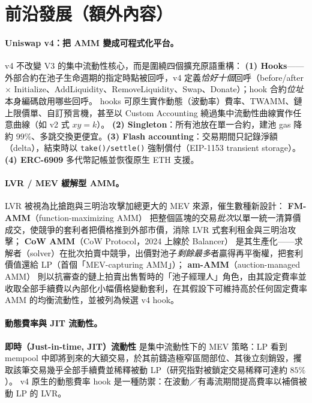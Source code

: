 \documentclass[11pt,a4paper]{article}
\begin{document}
\section{前沿發展（額外內容）}\label{sec:frontier}
\paragraph{Uniswap v4：把 AMM 變成可程式化平台。}
v4 \citep{uniswapv4wp,uniswapv4vision,uniswapv4hooks} 不改變 V3 的集中流動性核心，而是圍繞四個擴充原語重構：
\textbf{(1) Hooks}——外部合約在池子生命週期的指定時點被回呼，v4 定義\emph{恰好十個}回呼（before/after $\times$ Initialize、AddLiquidity、RemoveLiquidity、Swap、Donate）；hook 合約\emph{位址}本身編碼啟用哪些回呼。
hooks 可原生實作動態（波動率）費率、TWAMM、鏈上限價單、自訂預言機，甚至以 Custom Accounting 繞過集中流動性曲線實作任意曲線（如 v2 式 $xy=k$）。
\textbf{(2) Singleton}：所有池放在單一合約，建池 gas 降約 $99\%$、多跳交換更便宜。\textbf{(3) Flash accounting}：交易期間只記錄淨額（delta），結束時以 \texttt{take()/settle()} 強制償付（EIP-1153 transient storage）。\textbf{(4) ERC-6909} 多代幣記帳並恢復原生 ETH 支援。

\paragraph{LVR / MEV 緩解型 AMM。}
LVR \citep{milionis2022lvr,a16zlvr} 被視為比搶跑與三明治攻擊加總更大的 MEV 來源，催生數種新設計：
\textbf{FM-AMM}（function-maximizing AMM）\citep{canidio2023fmamm} 把整個區塊的交易\emph{批次}以單一統一清算價成交，使競爭的套利者把價格推到外部市價，消除 LVR 式套利租金與三明治攻擊；
\textbf{CoW AMM}（CoW Protocol，2024 上線於 Balancer）\citep{cowammdocs,cowammlaunch} 是其生產化——求解者（solver）在批次拍賣中競爭，出價對池子\emph{剩餘最多}者贏得再平衡權，把套利價值還給 LP（首個「MEV-capturing AMM」）；
\textbf{am-AMM}（auction-managed AMM）\citep{adams2024amamm} 則以抗審查的鏈上拍賣出售暫時的「池子經理人」角色，由其設定費率並收取全部手續費以內部化小幅價格變動套利，在其假設下可維持高於任何固定費率 AMM 的均衡流動性，並被列為候選 v4 hook。

\paragraph{動態費率與 JIT 流動性。}
\textbf{即時（Just-in-time, JIT）流動性} \citep{uniswapjit,jitaft2025} 是集中流動性下的 MEV 策略：LP 看到 mempool 中即將到來的大額交易，於其前鑄造極窄區間部位、其後立刻銷毀，攫取該筆交易幾乎全部手續費並稀釋被動 LP（研究指對被鎖定交易稀釋可達約 $85\%$）。
v4 原生的動態費率 hook 是一種防禦：在波動／有毒流期間提高費率以補償被動 LP 的 LVR。
\end{document}
